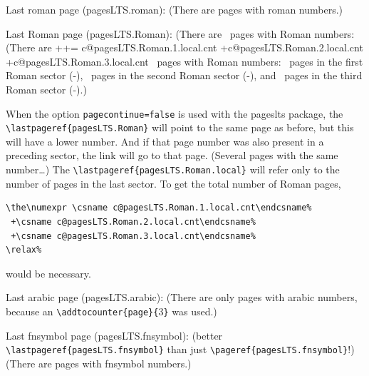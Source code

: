\documentclass[british]{article}[2024/06/29]%
\def\pagesLTSexampleArabic{3}
\begin{document}
Last roman page (pagesLTS.roman): 
(There are  pages with roman numbers.)\bigskip

Last Roman page (pagesLTS.Roman): %
\makeatletter%
\ifpagesLTS@pagecontinue%
  (There are ~pages with Roman numbers:\newline
\else%
  (There are %
  ++=%
   \the\numexpr%
    \csname c@pagesLTS.Roman.1.local.cnt\endcsname%
   +\csname c@pagesLTS.Roman.2.local.cnt\endcsname%
   +\csname c@pagesLTS.Roman.3.local.cnt\endcsname%
   \relax~pages with Roman numbers:\newline
\fi%
\makeatother%
~pages in the first Roman sector
(\pageref{Roman}{\hskip3em }-),\newline
{}~pages in the second Roman sector
(\pageref{Roman2}{\hskip3em }-), and\newline
{}~pages in the third Roman sector
(\pageref{Roman3}{\hskip3em }-).)\bigskip

When the option \texttt{pagecontinue=false} is used with the
\textsf{pageslts} package, the \verb|\lastpageref{pagesLTS.Roman}| will
point to the same page as before, but this will have a lower number.
And if that page number was also present in a preceding sector,
the link will go to that page. (Several pages with the same number\ldots)\newline
The \verb|\lastpageref{pagesLTS.Roman.local}| will refer only to the number
of pages in the last sector. To get the total number of Roman pages, %
\begin{verbatim}
\the\numexpr \csname c@pagesLTS.Roman.1.local.cnt\endcsname%
 +\csname c@pagesLTS.Roman.2.local.cnt\endcsname%
 +\csname c@pagesLTS.Roman.3.local.cnt\endcsname%
\relax%
\end{verbatim}%
would be necessary.\bigskip

Last arabic page (pagesLTS.arabic): 
(There are only  pages with arabic numbers,
because an \verb|\addtocounter{page}{|\pagesLTSexampleArabic\verb|}| was used.)\bigskip

Last fnsymbol page (pagesLTS.fnsymbol): \newline
(better \verb|\lastpageref{pagesLTS.fnsymbol}| than just\newline
\verb|\pageref{pagesLTS.fnsymbol}|!)\newline
(There are  pages with fnsymbol numbers.)\bigskip
\end{document}
